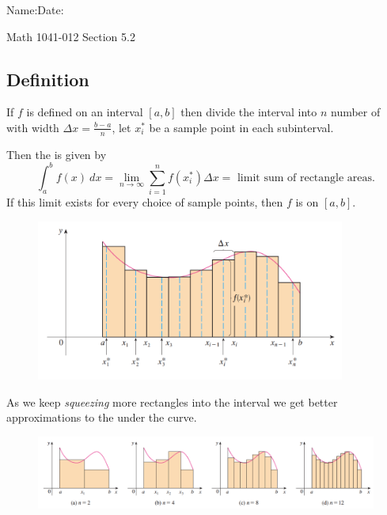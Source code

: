 \documentclass[10pt]{book}
\theoremstyle{definition}
\begin{document}
\begin{flushleft}
Name:\underline{\hspace{13cm}}Date:\underline{\hspace{2cm}}
\end{flushleft}
\begin{center}
{\Large Math 1041-012 \hspace{0.5cm} Section 5.2}
\end{center}

\begin{tcolorbox}
\subsection*{Definition}
If $f$ is defined on an interval $[a,b]$ then divide the interval into $n$ number of \underline{\hspace{4cm}} with width $\displaystyle \Delta x=\frac{b-a}{n}$, let $x_i^*$ be a sample point in each subinterval.

Then the \underline{\hspace{8cm}} is given by
\[
\int_a^b f(x)\ dx=\lim_{n\rightarrow\infty}\sum_{i=1}^n f(x_i^*)\Delta x=\textrm{ limit sum of rectangle areas}.
\]
If this limit exists for every choice of sample points, then $f$ is \underline{\hspace{3cm}} on $[a,b]$.
\end{tcolorbox}
\begin{figure}[h!]
    \centering
    \includegraphics[width=4in]{intRect.png}
\end{figure}
\noindent As we keep \textit{squeezing} more rectangles into the interval we get better approximations to the \underline{\hspace{3cm}} under the curve.
\begin{figure}[h!]
    \centering
    \includegraphics{rect2.png}
\end{figure}\\
\end{document}
